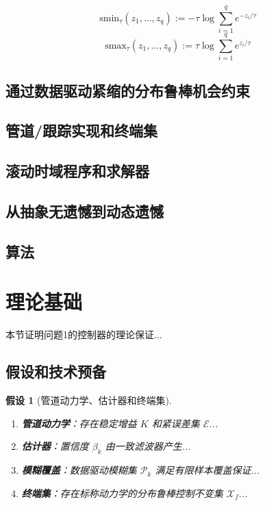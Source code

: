\documentclass[12pt,a4paper]{ctexart}
\numberwithin{equation}{section}
\newtheorem{assumption}[theorem]{假设}
\begin{document}
\begin{equation}
    \mathrm{smin}_\tau(z_1,\dots,z_q):=-\tau\log\sum_{i=1}^q e^{-z_i/\tau}
\end{equation}
\begin{equation}
    \mathrm{smax}_\tau(z_1,\dots,z_q):=\tau\log\sum_{i=1}^q e^{z_i/\tau}
\end{equation}

\subsection{通过数据驱动紧缩的分布鲁棒机会约束}

\subsection{管道/跟踪实现和终端集}

\subsection{滚动时域程序和求解器}

\subsection{从抽象无遗憾到动态遗憾}

\subsection{算法}

\clearpage
\section{理论基础}

本节证明问题1的控制器的理论保证...

\subsection{假设和技术预备}

\begin{assumption}[管道动力学、估计器和终端集]
    \begin{enumerate}[label=(\roman*)]
        \item \textbf{管道动力学}：存在稳定增益 $K$ 和紧误差集 $\mathcal{E}$...
        \item \textbf{估计器}：置信度 $\beta_k$ 由一致滤波器产生...
        \item \textbf{模糊覆盖}：数据驱动模糊集 $\mathcal{P}_k$ 满足有限样本覆盖保证...
        \item \textbf{终端集}：存在标称动力学的分布鲁棒控制不变集 $\mathcal{X}_f$...
    \end{enumerate}
\end{assumption}
\end{document}
